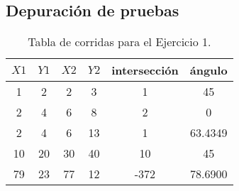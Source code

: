 \subsection{Depuración de pruebas}

\begin{table}[h!]
  \centering
  \caption{Tabla de corridas para el Ejercicio 1.}
  \label{tab:tabla_ejemplo}
  \begin{tabular}{|c|c|c|c|c|c|}
    \hline
    \textbf{$X1$} & \textbf{$Y1$} & \textbf{$X2$} & \textbf{$Y2$} & \textbf{intersección} & \textbf{ángulo} \\
    \hline
    1 & 2 & 2 & 3 & 1 & 45\\
    2 & 4 & 6 & 8 & 2 & 0\\
    2 & 4 & 6 & 13 & 1 & 63.4349\\
    10 & 20 & 30 & 40 & 10 & 45\\
    79 & 23 & 77 & 12 & -372 & 78.6900\\
    
    \hline
  \end{tabular}
\end{table}
